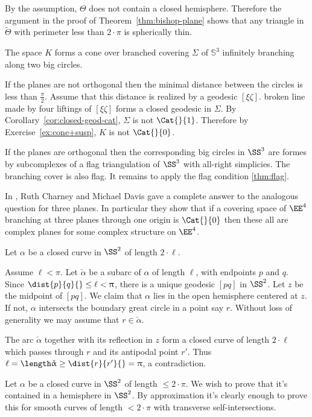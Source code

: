 By the assumption, $\Theta$ does not contain a closed hemisphere. 
Therefore the argument in the proof of Theorem~\ref{thm:bishop-plane} shows that any triangle in $\tilde\Theta$ with perimeter less than $2\cdot\pi$ is spherically thin. 
\qeds


The space $K$ forms a cone over branched covering $\Sigma$ of $\mathbb{S}^3$ infinitely branching along two big circles.

If the planes are not orthogonal then the minimal distance between the circles is less than $\tfrac\pi2$.
Assume that this distance is realized by a geodesic $[\xi\zeta]$.
broken line made by four liftings of $[\xi\zeta]$ forms a closed geodesic in $\Sigma$. 
By Corollary~\ref{cor:closed-geod-cat}, $\Sigma$ is not $\Cat{}{1}$.
Therefore by Exercise~\ref{ex:cone+susp}, $K$ is not $\Cat{}{0}$.

If the planes are orthogonal then the corresponding big circles in $\SS^3$ are formes by subcomplexes of a flag triangulation of $\SS^3$ with all-right simplicies.
The branching cover is also flag.
It remains to apply the flag condition \ref{thm:flag}.

In \cite{charney-davis-93}, Ruth Charney and Michael Davis
gave a complete answer to the analogous question for three planes.
In particular they show that if a covering space of $\EE^4$
branching at three planes through one origin is $\Cat{}{0}$ then these all are complex planes for some complex structure on $\EE^4$.
\qeds

Let $\alpha$ be a closed curve in $\SS^2$ of length $2\cdot\ell$.

Assume $\ell<\pi$.
Let $\check\alpha$ be a subarc of $\alpha$ of length $\ell$, with endpoints $p$ and $q$. 
Since $\dist{p}{q}{}\le\ell<\pi$, there is a unique geodesic $[pq]$ in $\SS^2$.  
Let $z$ be the midpoint of  $[pq]$.  
We claim that $\alpha$ lies in the open hemisphere centered at $z$.  
If not, $\alpha$ intersects the boundary  great circle in a point say $r$.
Without loss of generality we may assume that $r\in\check\alpha$.

The arc $\check\alpha$ together with its reflection in $z$ form a closed curve of length $2\cdot \ell$ which passes through $r$ and its antipodal point $r'$.
Thus $\ell=\length \check\alpha\ge \dist{r}{r'}{}=\pi$, a contradiction.
\qeds

Let $\alpha$ be a closed curve in  $\SS^2$ of length $\le 2\cdot\pi$.  We wish to prove that it's contained in a hemisphere in $\SS^2$.
By approximation it's clearly enough to prove this for  smooth curves of length $< 2\cdot\pi$ with transverse self-intersections. 

